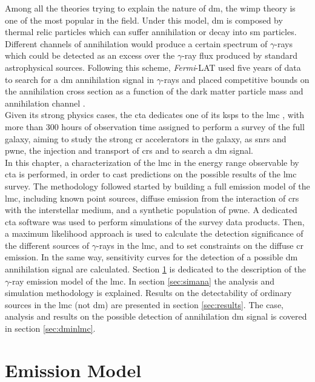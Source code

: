 \documentclass[main.tex]{subfiles}
\begin{document}
Among all the theories trying to explain the nature of \gls{dm}, the \gls{wimp} theory is one of the most popular in the field. Under this model, \gls{dm} is composed by thermal relic particles which can suffer annihilation or decay into \gls{sm} particles. Different channels of annihilation would produce a certain spectrum of $\gamma$-rays \cite{2011cirelli} which could be detected as an excess over the $\gamma$-ray flux produced by standard astrophysical sources. Following this scheme, \textit{Fermi}-LAT used five years of data to search for a \gls{dm} annihilation signal in $\gamma$-rays and placed competitive bounds on the annihilation cross section as a function of the dark matter particle mass and annihilation channel \cite{2010FermiLATLMC11months}.\\
Given its strong physics cases, the \gls{cta} dedicates one of its \glspl{ksp} to the \gls{lmc} \cite{2019SciencewithCTA}, with more than 300 hours of observation time assigned to perform a survey of the full galaxy, aiming to study the strong \gls{cr} accelerators in the galaxy, as \glspl{snr} and \gls{pwne}, the injection and transport of \glspl{cr} and to  search a \gls{dm} signal.\\
In this chapter, a characterization of the \gls{lmc} in the energy range observable by \gls{cta} is performed, in order to cast predictions on the possible results of the \gls{lmc} survey. The methodology followed started by building a full emission model of the \gls{lmc}, including known point sources, diffuse emission from the interaction of \glspl{cr} with the interstellar medium, and a synthetic population of \gls{pwne}. A dedicated \gls{cta} software was used to perform simulations of the survey data products. Then, a maximum likelihood approach is used to calculate the detection significance of the different sources of $\gamma$-rays in the \gls{lmc}, and to set constraints on the diffuse \gls{cr} emission. In the same way, sensitivity curves for the detection of a possible \gls{dm} annihilation signal are calculated. Section \ref{sec:model} is dedicated to the description of the $\gamma$-ray emission model of the \gls{lmc}. In section \ref{sec:simana} the analysis and simulation methodology is explained. Results on the detectability of ordinary sources in the \gls{lmc} (not \gls{dm}) are presented in section \ref{sec:results}. The case, analysis and results on the possible detection of annihilation \gls{dm} signal is covered in section \ref{sec:dminlmc}.  

\section{Emission Model} \label{sec:model}
\end{document}
